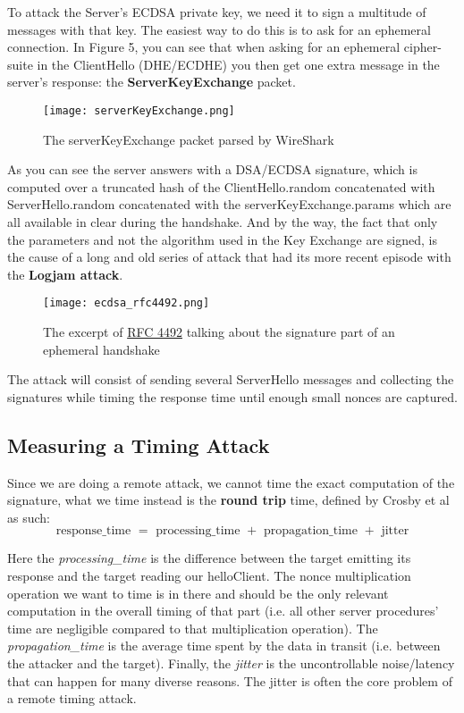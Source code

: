 \documentclass[a4paper,11pt]{article}
\begin{document}
To attack the Server's ECDSA private key, we need it to sign a multitude of messages with that key. The easiest way to do this is to ask for an ephemeral connection. In Figure 5, you can see that when asking for an ephemeral cipher-suite in the ClientHello (DHE/ECDHE) you then get one extra message in the server's response: the \textbf{ServerKeyExchange} packet.

\begin{figure}[H]
\texttt{[image: serverKeyExchange.png]}
\caption{The serverKeyExchange packet parsed by WireShark}
\end{figure}

As you can see the server answers with a DSA/ECDSA signature, which is computed over a truncated hash of the ClientHello.random concatenated with ServerHello.random concatenated with the serverKeyExchange.params which are all available in clear during the handshake. And by the way, the fact that only the parameters and not the algorithm used in the Key Exchange are signed, is the cause of a long and old series of attack that had its more recent episode with the \textbf{Logjam attack}\cite{logjam}.

\begin{figure}[H]
\texttt{[image: ecdsa\_rfc4492.png]}
\caption{The excerpt of \href{https://tools.ietf.org/html/rfc4492#section-5.4}{RFC 4492} talking about the signature part of an ephemeral handshake}
\end{figure}

The attack will consist of sending several ServerHello messages and collecting the signatures while timing the response time until enough small nonces are captured.

\subsection{Measuring a Timing Attack}

Since we are doing a remote attack, we cannot time the exact computation of the signature, what we time instead is the \textbf{round trip} time, defined by Crosby et al\cite{crosby} as such:
$$ \text{response\_time } = \text{ processing\_time } + \text{ propagation\_time } + \text{ jitter} $$

Here the \textit{processing\_time} is the difference between the target emitting its response and the target reading our helloClient. The nonce multiplication operation we want to time is in there and should be the only relevant computation in the overall timing of that part (i.e. all other server procedures' time are negligible compared to that multiplication operation). The \textit{propagation\_time} is the average time spent by the data in transit (i.e. between the attacker and the target). Finally, the \textit{jitter} is the uncontrollable noise/latency that can happen for many diverse reasons. The jitter is often the core problem of a remote timing attack.\\
\end{document}
